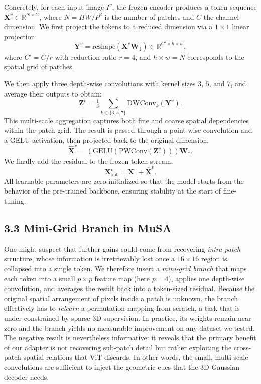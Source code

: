 \documentclass[letterpaper]{article} %
\begin{document}
Concretely, for each input image $I^v$, the frozen encoder produces a token sequence $\mathbf{X}^{v} \in \mathbb{R}^{N \times C}$, where $N = HW / P^2$ is the number of patches and $C$ the channel dimension. We first project the tokens to a reduced dimension via a $1\times1$ linear projection:  
\begin{equation}
\mathbf{Y}^{v} = \mathrm{reshape}(\mathbf{X}^{v} \mathbf{W}_{\!\downarrow}) \in \mathbb{R}^{C' \times h \times w},
\end{equation}
where $C' = C / r$ with reduction ratio $r=4$, and $h \times w = N$ corresponds to the spatial grid of patches.  

We then apply three depth-wise convolutions with kernel sizes $3$, $5$, and $7$, and average their outputs to obtain:
\begin{equation}
\mathbf{Z}^{v} = \tfrac{1}{3} \sum_{k \in \{3, 5, 7\}} \mathrm{DWConv}_{k}(\mathbf{Y}^{v}).
\end{equation}
This multi-scale aggregation captures both fine and coarse spatial dependencies within the patch grid. The result is passed through a point-wise convolution and a GELU activation, then projected back to the original dimension:
\begin{equation}
\widehat{\mathbf{X}}^{v} = \left(\mathrm{GELU}\left(\mathrm{PWConv}(\mathbf{Z}^{v}) \right) \right) \mathbf{W}_{\!\uparrow}.
\end{equation}
We finally add the residual to the frozen token stream:
\begin{equation}
\mathbf{X}^{v}_{\text{out}} = \mathbf{X}^{v} + \widehat{\mathbf{X}}^{v}.
\end{equation}
All learnable parameters are zero-initialized so that the model starts from the behavior of the pre-trained backbone, ensuring stability at the start of fine-tuning.

\subsection{3.3 Mini-Grid Branch in MuSA}

One might suspect that further gains could come from recovering \emph{intra-patch} structure, whose information is irretrievably lost once a $16\times16$ region is collapsed into a single token.
We therefore insert a \textit{mini-grid branch} that maps each token into a small $p\times p$ feature map (here $p{=}4$), applies one depth-wise convolution, and averages the result back into a token-sized residual.
Because the original spatial arrangement of pixels inside a patch is unknown, the branch effectively has to \emph{relearn} a permutation mapping from scratch, a task that is under-constrained by sparse 3D supervision.
In practice, its weights remain near-zero and the branch yields no measurable improvement on any dataset we tested.
The negative result is nevertheless informative: it reveals that the primary benefit of our adapter is not recovering sub-patch detail but rather exploiting the cross-patch spatial relations that ViT discards.
In other words, the small, multi-scale convolutions are sufficient to inject the geometric cues that the 3D Gaussian decoder needs.
\end{document}
